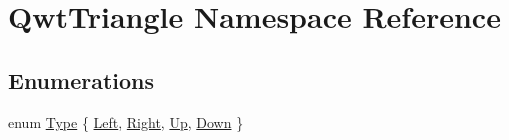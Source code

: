 \hypertarget{namespace_qwt_triangle}{\section{Qwt\-Triangle Namespace Reference}
\label{namespace_qwt_triangle}
}
\subsection*{Enumerations}
\begin{DoxyCompactItemize}
\item 
enum \hyperlink{namespace_qwt_triangle_afc6dd44443c28b94434655a8bed1ef91}{Type} \{ \hyperlink{namespace_qwt_triangle_afc6dd44443c28b94434655a8bed1ef91abf6256310ceafa591e7b2ff2993a6efa}{Left}, 
\hyperlink{namespace_qwt_triangle_afc6dd44443c28b94434655a8bed1ef91aff75afa0cd8fb243b7a32c6df10ec429}{Right}, 
\hyperlink{namespace_qwt_triangle_afc6dd44443c28b94434655a8bed1ef91acdae339e7ab98bd405354741cbeb2c52}{Up}, 
\hyperlink{namespace_qwt_triangle_afc6dd44443c28b94434655a8bed1ef91a73cf3dba4605e6cbf95fa1c1df40fa7a}{Down}
 \}
\end{DoxyCompactItemize}


